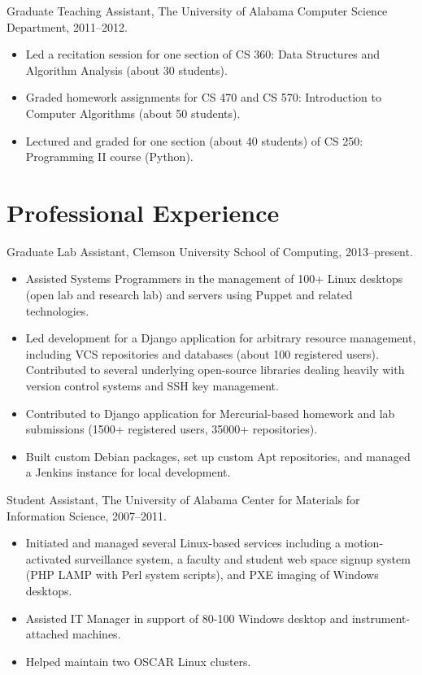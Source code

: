 \documentclass[12pt,oldfontcommands]{memoir}
\begin{document}
Graduate Teaching Assistant, The University of Alabama Computer Science
Department, 2011--2012.

\begin{itemize}
  \item Led a recitation session for one section of CS 360: Data Structures and
        Algorithm Analysis (about 30 students).
  \item Graded homework assignments for CS 470 and CS 570: Introduction to
        Computer Algorithms (about 50 students).
  \item Lectured and graded for one section (about 40 students) of CS 250:
        Programming II course (Python).
\end{itemize}

\section*{Professional Experience}

Graduate Lab Assistant, Clemson University School of Computing, 2013--present.

\begin{itemize}
  \item Assisted Systems Programmers in the management of 100+ Linux desktops
        (open lab and research lab) and servers using Puppet and related
        technologies.
  \item Led development for a Django application for arbitrary resource
        management, including VCS repositories and databases (about 100
        registered users). Contributed to several underlying open-source
        libraries dealing heavily with version control systems and SSH key
        management.
  \item Contributed to Django application for Mercurial-based homework and lab
        submissions (1500+ registered users, 35000+ repositories).
  \item Built custom Debian packages, set up custom Apt repositories, and
        managed a Jenkins instance for local development.
\end{itemize}


Student Assistant, The University of Alabama Center for Materials for
Information Science, 2007--2011.

\begin{itemize}
  \item Initiated and managed several Linux-based services including a
        motion-activated surveillance system, a faculty and student web space
        signup system (PHP LAMP with Perl system scripts), and PXE imaging of
        Windows desktops.
  \item Assisted IT Manager in support of 80-100 Windows desktop and
        instrument-attached machines.
  \item Helped maintain two OSCAR Linux clusters.
\end{itemize}

\nocite{*}


\end{document}
